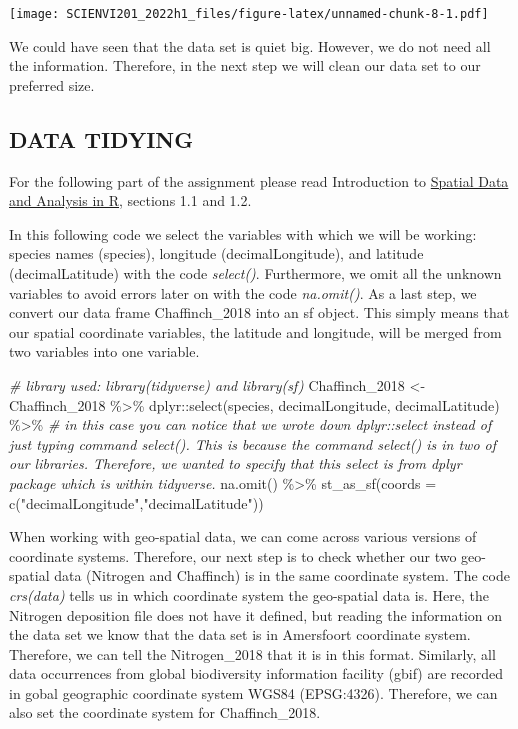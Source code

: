 \documentclass[
]{article}
\newenvironment{Shaded}{\begin{snugshade}}{\end{snugshade}}
\newcommand{\AttributeTok}[1]{\textcolor[rgb]{0.77,0.63,0.00}{#1}}
\newcommand{\CommentTok}[1]{\textcolor[rgb]{0.56,0.35,0.01}{\textit{#1}}}
\newcommand{\FunctionTok}[1]{\textcolor[rgb]{0.00,0.00,0.00}{#1}}
\newcommand{\NormalTok}[1]{#1}
\newcommand{\OtherTok}[1]{\textcolor[rgb]{0.56,0.35,0.01}{#1}}
\newcommand{\SpecialCharTok}[1]{\textcolor[rgb]{0.00,0.00,0.00}{#1}}
\newcommand{\StringTok}[1]{\textcolor[rgb]{0.31,0.60,0.02}{#1}}
\begin{document}
\texttt{[image: SCIENVI201\_2022h1\_files/figure-latex/unnamed-chunk-8-1.pdf]}

We could have seen that the data set is quiet big. However, we do not
need all the information. Therefore, in the next step we will clean our
data set to our preferred size.

\hypertarget{data-tidying}{%
\subsection{DATA TIDYING}\label{data-tidying}}

For the following part of the assignment please read Introduction to
\href{https://wec.wur.nl/r/spatial/introduction.html}{Spatial Data and
Analysis in R}, sections 1.1 and 1.2.

In this following code we select the variables with which we will be
working: species names (species), longitude (decimalLongitude), and
latitude (decimalLatitude) with the code \emph{select()}. Furthermore,
we omit all the unknown variables to avoid errors later on with the code
\emph{na.omit()}. As a last step, we convert our data frame
Chaffinch\_2018 into an sf object. This simply means that our spatial
coordinate variables, the latitude and longitude, will be merged from
two variables into one variable.

\begin{Shaded}
\begin{Highlighting}[]
\CommentTok{\# library used: library(tidyverse) and library(sf)}
\NormalTok{Chaffinch\_2018 }\OtherTok{\textless{}{-}}\NormalTok{ Chaffinch\_2018 }\SpecialCharTok{\%\textgreater{}\%}
\NormalTok{  dplyr}\SpecialCharTok{::}\FunctionTok{select}\NormalTok{(species, decimalLongitude, decimalLatitude) }\SpecialCharTok{\%\textgreater{}\%} \CommentTok{\# in this case you can notice that we wrote down dplyr::select instead of just typing command select(). This is because the command select() is in two of our libraries. Therefore, we wanted to specify that this select is from dplyr package which is within tidyverse.}
  \FunctionTok{na.omit}\NormalTok{() }\SpecialCharTok{\%\textgreater{}\%}
  \FunctionTok{st\_as\_sf}\NormalTok{(}\AttributeTok{coords =} \FunctionTok{c}\NormalTok{(}\StringTok{"decimalLongitude"}\NormalTok{,}\StringTok{"decimalLatitude"}\NormalTok{)) }
\end{Highlighting}
\end{Shaded}

When working with geo-spatial data, we can come across various versions
of coordinate systems. Therefore, our next step is to check whether our
two geo-spatial data (Nitrogen and Chaffinch) is in the same coordinate
system. The code \emph{crs(data)} tells us in which coordinate system
the geo-spatial data is. Here, the Nitrogen deposition file does not
have it defined, but reading the information on the data set we know
that the data set is in Amersfoort coordinate system. Therefore, we can
tell the Nitrogen\_2018 that it is in this format. Similarly, all data
occurrences from global biodiversity information facility (gbif) are
recorded in gobal geographic coordinate system WGS84 (EPSG:4326).
Therefore, we can also set the coordinate system for Chaffinch\_2018.
\end{document}
